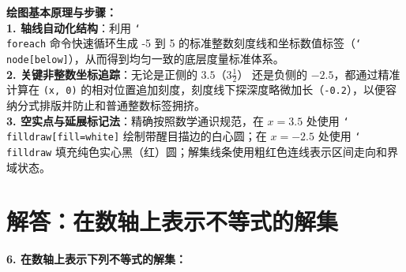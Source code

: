 {\small\color{blue!70!black}
\textbf{绘图基本原理与步骤：}\\
\textbf{1. 轴线自动化结构}：利用 \texttt{\char`\\foreach} 命令快速循环生成 -5 到 5 的标准整数刻度线和坐标数值标签（\texttt{\char`\\node[below]}），从而得到均匀一致的底层度量标准体系。\\
\textbf{2. 关键非整数坐标追踪}：无论是正侧的 $3.5$（$3\frac{1}{2}$） 还是负侧的 $-2.5$，都通过精准计算在 \texttt{(x, 0)} 的相对位置追加刻度，刻度线下探深度略微加长（\texttt{-0.2}），以便容纳分式排版并防止和普通整数标签拥挤。\\
\textbf{3. 空实点与延展标记法}：精确按照数学通识规范，在 $x=3.5$ 处使用 \texttt{\char`\\filldraw[fill=white]} 绘制带醒目描边的白心圆；在 $x=-2.5$ 处使用 \texttt{\char`\\filldraw} 填充纯色实心黑（红）圆；解集线条使用粗红色连线表示区间走向和界域状态。
}

\newpage



\section{解答：在数轴上表示不等式的解集}

\vspace{0.6cm}

\textbf{6. 在数轴上表示下列不等式的解集：}

\vspace{0.4cm}

